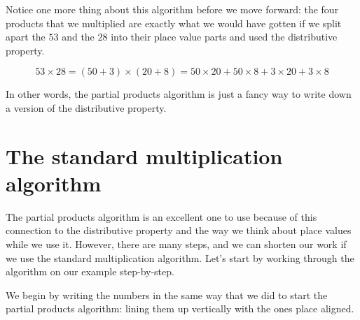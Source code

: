 \documentclass{ximera}
\begin{document}
Notice one more thing about this algorithm before we move forward: the four products that we multiplied are exactly what we would have gotten if we split apart the $53$ and the $28$ into their place value parts and used the distributive property.

\[
53 \times 28 = (50 + 3) \times (20 + 8) = 50 \times 20 + 50 \times 8 + 3 \times 20 + 3 \times 8
\]

In other words, the partial products algorithm is just a fancy way to write down a version of the distributive property. 


\section{The standard multiplication algorithm}

The partial products algorithm is an excellent one to use because of this connection to the distributive property and the way we think about place values while we use it. However, there are many steps, and we can shorten our work if we use the standard multiplication algorithm. Let's start by working through the algorithm on our example step-by-step.

We begin by writing the numbers in the same way that we did to start the partial products algorithm: lining them up vertically with the ones place aligned. 

\begin{image}
\end{image}
\end{document}
